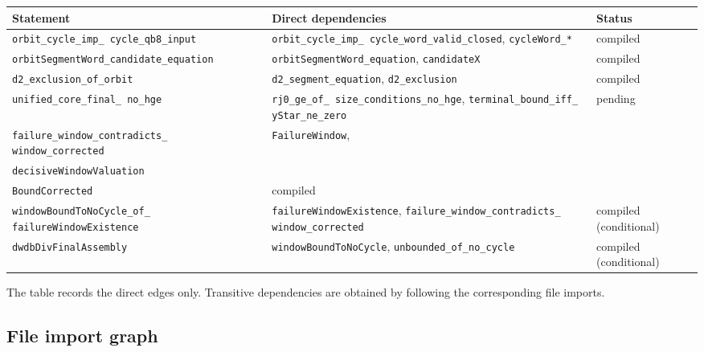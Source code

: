 \begin{center}
\small
\begin{tabular}{@{}p{}p{}p{}@{}}
\toprule
Statement & Direct dependencies & Status \\
\midrule
\texttt{orbit\_\allowbreak cycle\_\allowbreak imp\_\allowbreak
  cycle\_\allowbreak qb8\_\allowbreak input} &
  \texttt{orbit\_\allowbreak cycle\_\allowbreak imp\_\allowbreak
  cycle\_\allowbreak word\_\allowbreak valid\_\allowbreak closed},
  \texttt{cycleWord\_*} & compiled \\
\texttt{orbitSegmentWord\_\allowbreak candidate\_\allowbreak equation} &
  \texttt{orbitSegmentWord\_\allowbreak equation},
  \texttt{candidateX} & compiled \\
\texttt{d2\_\allowbreak exclusion\_\allowbreak of\_\allowbreak orbit} &
  \texttt{d2\_\allowbreak segment\_\allowbreak equation},
  \texttt{d2\_\allowbreak exclusion} & compiled \\
\texttt{unified\_\allowbreak core\_\allowbreak final\_\allowbreak
  no\_\allowbreak hge} &
  \texttt{rj0\_\allowbreak ge\_\allowbreak of\_\allowbreak
  size\_\allowbreak conditions\_\allowbreak no\_\allowbreak hge},
  \texttt{terminal\_\allowbreak bound\_\allowbreak iff\_\allowbreak
  yStar\_\allowbreak ne\_\allowbreak zero} & pending \\
\texttt{failure\_\allowbreak window\_\allowbreak contradicts\_\allowbreak
  window\_\allowbreak corrected} &
  \texttt{FailureWindow},\\
  \texttt{decisiveWindowValuation}\\
  \texttt{BoundCorrected} & compiled \\
\texttt{windowBoundToNoCycle\_\allowbreak of\_\allowbreak
  failureWindowExistence} &
  \texttt{failureWindowExistence},
  \texttt{failure\_\allowbreak window\_\allowbreak contradicts\_\allowbreak
  window\_\allowbreak corrected} &
  compiled (conditional) \\
\texttt{dwdbDivFinalAssembly} &
  \texttt{windowBoundToNoCycle},
  \texttt{unbounded\_\allowbreak of\_\allowbreak no\_\allowbreak cycle} &
  compiled (conditional) \\
\bottomrule
\end{tabular}
\end{center}

The table records the direct edges only.  Transitive dependencies are
obtained by following the corresponding file imports.

\subsection{File import graph}

